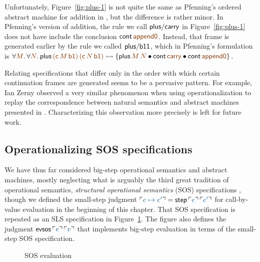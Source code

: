Unfortunately, Figure~\ref{fig:plus-1} is not quite the same as Pfenning's 
ordered abstract machine for addition in \cite{pfenning12ordered}, but the
difference is rather minor. In Pfenning's version of addition, the rule
we call ${\sf plus/carry}$ in Figure~\ref{fig:plus-1} does not have include
the conclusion ${\sf cont}\,\lf{\sf append0}$. Instead, that frame 
is generated earlier by the rule we called
${\sf plus/b11}$, which in Pfenning's formulation is
$\forall\lf{M}.\,\forall\lf{N}.\,
  {\sf plus}\,\lf{({\sf c}\,M\,{\sf b1})}\,\lf{({\sf c}\,N\,{\sf b1})}
  \lefti
  \{
    {\sf plus}\,\lf{M}\,\lf{N}
    \fuse
    {\sf cont}\,\lf{\sf carry}
    \fuse
    {\sf cont}\,\lf{\sf append0}
  \}$. 
%

Relating 
%
specifications that differ only in the order with which certain
continuation frames are generated seems to be a pervasive pattern. For
example, Ian Zerny observed a very similar phenomenon when using
operationalization to replay the correspondence between natural
semantics and abstract machines presented in
\cite{danvy12interderiving}. Characterizing this observation more
precisely is left for future work.



\subsection{Operationalizing SOS specifications}
\label{sec:evaluationcontexts}


We have thus far considered big-step operational semantics and
abstract machines, mostly neglecting what is arguably the third great
tradition of operational semantics, {\it structural operational
  semantics} (SOS) specifications \cite{plotkin04structural}, though
we defined the small-step judgment $\interp{e \mapsto e'} = {\sf
  step}\,\interp{e}\,\interp{e'}$ for call-by-value evaluation in the
beginning of this chapter.  That SOS specification is repeated as an
SLS specification in Figure~\ref{fig:cbv-sos-b}. The figure also
defines the judgment ${\sf evsos}\,\interp{e}\,\interp{v}$ that
implements big-step evaluation in terms of the small-step SOS
specification.

\begin{figure}[tp]
\begin{minipage}[b]{0.9\linewidth}
\end{minipage}
\caption{SOS evaluation}
\label{fig:cbv-sos-b}
\end{figure}


